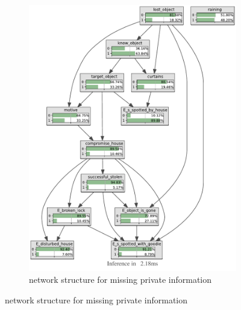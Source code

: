 \begin{figure}[h]
\begin{center}
\begin{subfigure}{.50\textwidth}
\includegraphics[width=\linewidth]{../experiments/StolenLaptopPrivate/bnImage/BNIMAGEStolenLaptopPrivate.pdf}
\caption{network structure for missing private information}
\label{privatelaptopAcc}
\end{subfigure}
\end{center}


\end{figure}
